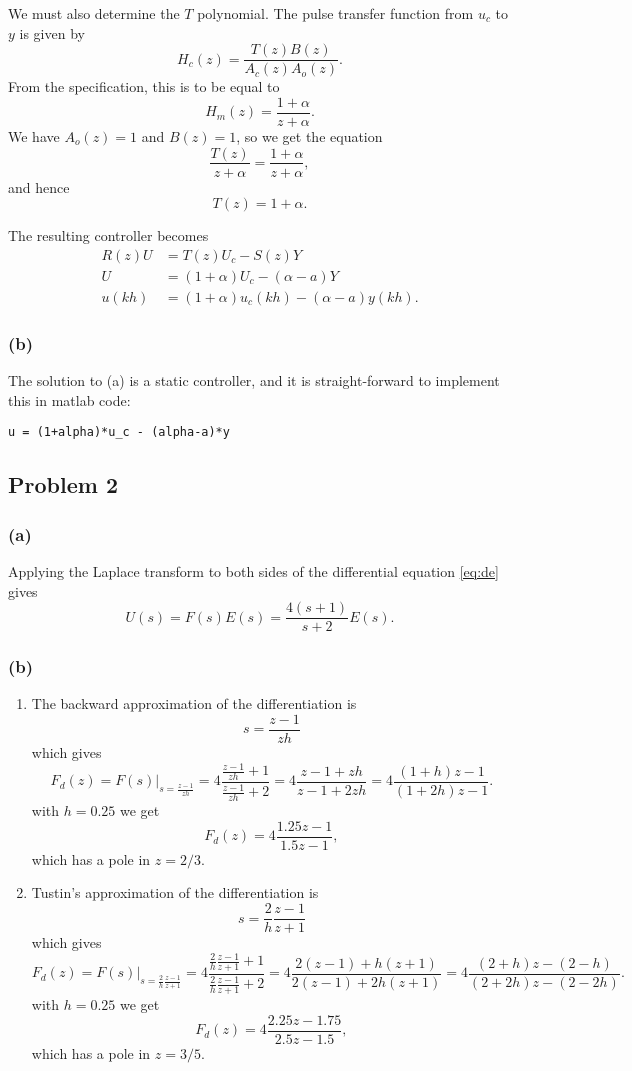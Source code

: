 \documentclass{scrartcl}
\begin{document}
We must also determine the \(T\) polynomial. The pulse transfer function from \(u_c\) to \(y\) is given by
\[ H_c(z) = \frac{T(z)B(z)}{A_c(z)A_o(z)}. \]
From the specification, this is to be equal to 
\[ H_m(z) = \frac{1+\alpha}{z+\alpha}. \]
We have \(A_o(z) = 1\) and \(B(z) = 1\), so we get the equation
\[ \frac{T(z)}{z+\alpha} = \frac{1+\alpha}{z+\alpha}, \]
and hence
\[ T(z) = 1 + \alpha. \]

The resulting controller becomes 
\begin{align}
 R(z) U &= T(z)U_c - S(z)Y\\
 U &= (1+\alpha)U_c - (\alpha-a)Y\\
 u(kh) &= (1+\alpha)u_c(kh) - (\alpha-a)y(kh).
\end{align}
\subsubsection*{(b)}
\label{sec:orgheadline12}
The solution to (a) is a static controller, and it is straight-forward to implement this in matlab code:
\begin{verbatim}
u = (1+alpha)*u_c - (alpha-a)*y
\end{verbatim}

\subsection*{Problem 2}
\label{sec:orgheadline16}
\subsubsection*{(a)}
\label{sec:orgheadline14}
Applying the Laplace transform to both sides of the differential equation \eqref{eq:de} gives
\[ U(s) = F(s)E(s) = \frac{4(s+1)}{s+2} E(s). \]
\subsubsection*{(b)}
\label{sec:orgheadline15}
\begin{enumerate}
\item The backward approximation of the differentiation is 
\[ s = \frac{z-1}{zh} \]
which gives
\[F_d(z) = F(s)|_{s=\frac{z-1}{zh}} = 4\frac{\frac{z-1}{zh} + 1}{\frac{z-1}{zh} + 2}
                = 4\frac{z-1+zh}{z-1 + 2zh} = 4\frac{(1+h)z - 1}{(1+2h)z - 1}. \]
with \(h=0.25\) we get
\[ F_d(z) = 4\frac{1.25z - 1}{1.5z - 1}, \]
which has a pole in \(z=2/3\).
\item Tustin's approximation of the differentiation is 
\[ s = \frac{2}{h}\frac{z-1}{z+1} \]
which gives
\[F_d(z) = F(s)|_{s=\frac{2}{h}\frac{z-1}{z+1}} = 4\frac{\frac{2}{h}\frac{z-1}{z+1} + 1}{\frac{2}{h}\frac{z-1}{z+1} + 2}
                = 4\frac{2(z-1) + h(z+1)}{2(z-1) + 2h(z+1)} = 4\frac{(2+h)z - (2-h)}{(2+2h)z -(2-2h)}. \]
with \(h=0.25\) we get
\[ F_d(z) = 4\frac{2.25z - 1.75}{2.5z - 1.5}, \]
which has a pole in \(z=3/5\).
\end{enumerate}
\end{document}
